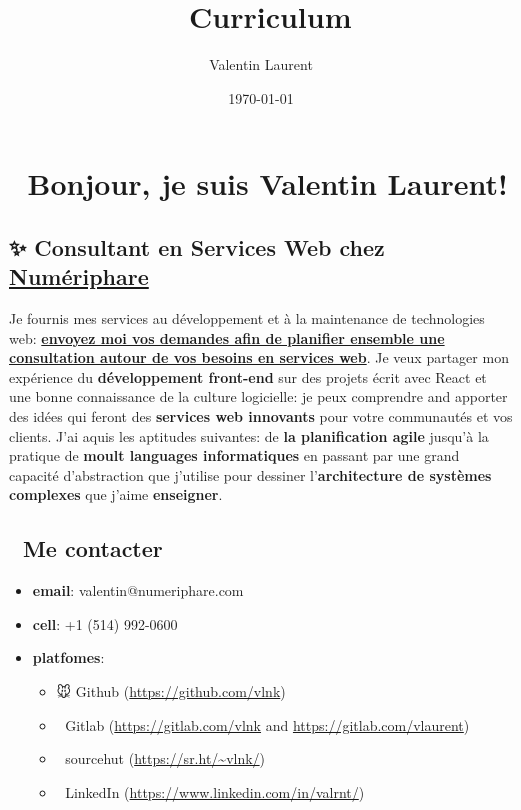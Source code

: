 \documentclass[11pt]{article}
\author{Valentin Laurent}
\date{\today}
\title{👔 Curriculum}
\begin{document}
\maketitle
\section{👋 Bonjour, je suis Valentin Laurent!}
\label{sec:org354974a}
\subsection{✨ \textbf{Consultant en Services Web} chez \href{https://www.numeriphare.com/}{Numériphare}}
\label{sec:orgbda67b7}
Je fournis mes services au développement et à la maintenance de technologies web: \textbf{\href{https://framaforms.org/contact-numeriphare-fr-1666985704}{envoyez moi vos demandes afin de planifier ensemble une consultation autour de vos besoins en services web}}. Je veux partager mon expérience du \textbf{développement front-end} sur des projets écrit avec React et une bonne connaissance de la culture logicielle: je peux comprendre and apporter des idées qui feront des \textbf{services web innovants} pour votre communautés et vos clients. J'ai aquis les aptitudes suivantes: de \textbf{la planification agile} jusqu'à la pratique de \textbf{moult languages informatiques} en passant par une grand capacité d'abstraction que j'utilise pour dessiner l'\textbf{architecture de systèmes complexes} que j'aime \textbf{enseigner}.

\subsection{📇 Me contacter}
\label{sec:orgb214b1c}
\begin{itemize}
\item \textbf{email}: valentin@numeriphare.com
\item \textbf{cell}: +1 (514) 992-0600
\item \textbf{platfomes}:
\begin{itemize}
\item 🐭 Github (\url{https://github.com/vlnk})
\item 🚀 Gitlab (\url{https://gitlab.com/vlnk} and \url{https://gitlab.com/vlaurent})
\item 🌲 sourcehut (\url{https://sr.ht/\~vlnk/})
\item 👞 LinkedIn (\url{https://www.linkedin.com/in/valrnt/})
\end{itemize}
\end{itemize}
\end{document}
